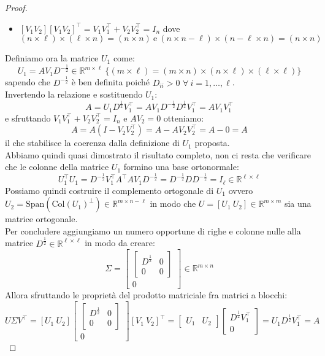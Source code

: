 \documentclass[11pt]{article}
\newcommand{\R}{\mathbb{R}}
\begin{document}
\begin{proof}
\begin{itemize}
	\item$[V_1 V_2][V_1 V_2]^\top      =V_1V_1^\top      +V_2V_2^\top      =I_n$ dove\\
 	$$(n \times \ell)\times(\ell \times n)=(n \times n) \ \text{e} \ (n \times n-\ell)\times(n-\ell \times  n)=(n \times n)$$
\end{itemize}
Definiamo ora la matrice $U_1$ come: $$U_1 = A V_1 D^{-\frac{1}{2}} \in \R^{m \times \ell}\ \lbrace(m \times \ell)=(m \times n)\times(n \times \ell)\times(\ell \times \ell)\rbrace$$ sapendo che $D^{-\frac{1}{2}}$ è ben definita poiché $D_{ii} > 0$ $\forall \ i = 1, \dots, \ell$.\\
Invertendo la relazione e sostituendo $U_1$: $$A=U_1D^{\frac{1}{2}}V_1^\top      =AV_1D^{-\frac12}D^{\frac12}V_1^\top      =AV_1V_1^\top      $$ e sfruttando $V_1V_1^\top      +V_2V_2^\top      =I_n$ e $AV_2=0$  otteniamo: $$A=A\left( I -V_2V_2^\top       \right)=A-AV_2V_2^\top      =A-0=A$$ il che stabilisce la coerenza dalla definizione di $U_1$ proposta.\\
Abbiamo quindi quasi dimostrato il risultato completo, non ci resta che verificare che le colonne della matrice $U_1$ formino una base ortonormale: $$ U_1^\top      U_1=D^{-\frac12}V_1^\top      A^\top      AV_1D^{-\frac12}=D^{-\frac12}DD^{-\frac12}=I_{\ell} \in \R^{\ell \times \ell} $$
Possiamo quindi costruire il complemento ortogonale di $U_1$ ovvero $U_2=\text{Span}(\text{Col}(U_1)^\perp) \in \R^{m \times n-\ell}$ in modo che $U=[U_1 \ U_2] \in \R^{m \times m}$ sia una matrice ortogonale.\\
Per concludere aggiungiamo un numero opportune di righe e colonne nulle alla matrice $D^{\frac12} \in \R^{\ell \times \ell}$ in modo da creare: $$\Sigma=\begin{bmatrix}
  \begin{bmatrix} D^\frac{1}{2} & 0 \\ 0 & 0 \end{bmatrix} \\
  0
\end{bmatrix} \in \R^{m \times n}$$
Allora sfruttando le proprietà del prodotto matriciale fra matrici a blocchi: 
$$U\Sigma V^\top      = [U_1 \ U_2]\begin{bmatrix}
  \begin{bmatrix} D^\frac{1}{2} & 0 \\ 0 & 0 \end{bmatrix} \\
  0
\end{bmatrix}[V_1 \ V_2]^\top      = \begin{bmatrix} U_1 & U_2 \end{bmatrix}
\begin{bmatrix} D^\frac{1}{2}V_1^\top       \\ 0 \end{bmatrix}
= U_1 D^\frac{1}{2} V_1^\top       = A $$
\end{proof}
\end{document}
